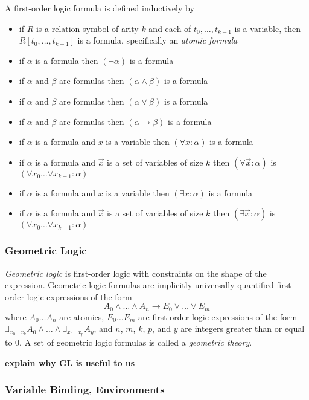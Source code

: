 			A first-order logic formula is defined inductively by
			\begin{itemize}
			\item if $R$ is a relation symbol of arity $k$ and each of $t_0 , \ldots , t_{k-1}$ is a variable, then $R[t_0,\ldots,t_{k-1}]$ is a formula, specifically an \emph{atomic formula}
			\item if $\alpha$ is a formula then $(\neg\alpha)$ is a formula
			\item if $\alpha$ and $\beta$ are formulas then $(\alpha\wedge\beta)$ is a formula
			\item if $\alpha$ and $\beta$ are formulas then $(\alpha\vee\beta)$ is a formula
			\item if $\alpha$ and $\beta$ are formulas then $(\alpha\to\beta)$ is a formula
			\item if $\alpha$ is a formula and $x$ is a variable then $(\forall x : \alpha)$ is a formula
			\item if $\alpha$ is a formula and $\vec{x}$ is a set of variables of size $k$ then $(\forall \vec{x} : \alpha)$ is $(\forall x_0 \ldots \forall x_{k-1} : \alpha)$
			\item if $\alpha$ is a formula and $x$ is a variable then $(\exists x : \alpha)$ is a formula
			\item if $\alpha$ is a formula and $\vec{x}$ is a set of variables of size $k$ then $(\exists \vec{x} : \alpha)$ is $(\forall x_0 \ldots \forall x_{k-1} : \alpha)$
			\end{itemize}

		\subsubsection{Geometric Logic}

			\emph{Geometric logic} is first-order logic with constraints on the
			shape of the expression.  Geometric logic formulas are implicitly
			universally quantified first-order logic expressions of the form \[A_0
			\wedge \ldots \wedge A_n \to E_0 \vee \ldots \vee E_m\] where $A_0
			\ldots A_n$ are atomics, $E_0 \ldots E_m$ are first-order logic
			expressions of the form $\exists_{x_0 \ldots x_k} A_0 \wedge \ldots
			\wedge \exists_{x_0 \ldots x_p} A_y$, and $n$, $m$, $k$, $p$, and $y$
			are integers greater than or equal to $0$. A set of geometric logic
			formulas is called a \emph{geometric theory}.

			\textbf{explain why GL is useful to us}

		\subsubsection{Variable Binding, Environments}

